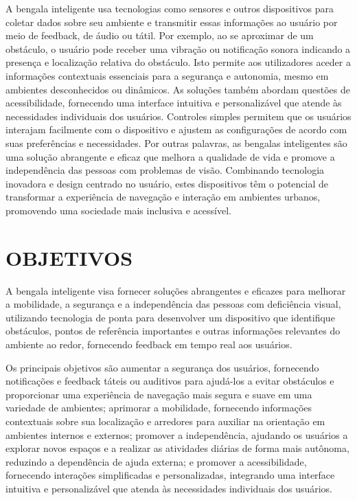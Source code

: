 A bengala inteligente usa tecnologias como sensores e outros dispositivos para coletar dados sobre seu ambiente e transmitir essas informações ao usuário por meio de feedback, de áudio ou tátil. Por exemplo, ao se aproximar de um obstáculo, o usuário pode receber uma vibração ou notificação sonora indicando a presença e localização relativa do obstáculo. Isto permite aos utilizadores aceder a informações contextuais essenciais para a segurança e autonomia, mesmo em ambientes desconhecidos ou dinâmicos.
As soluções também abordam questões de acessibilidade, fornecendo uma interface intuitiva e personalizável que atende às necessidades individuais dos usuários. Controles simples permitem que os usuários interajam facilmente com o dispositivo e ajustem as configurações de acordo com suas preferências e necessidades.
Por outras palavras, as bengalas inteligentes são uma solução abrangente e eficaz que melhora a qualidade de vida e promove a independência das pessoas com problemas de visão. Combinando tecnologia inovadora e design centrado no usuário, estes dispositivos têm o potencial de transformar a experiência de navegação e interação em ambientes urbanos, promovendo uma sociedade mais inclusiva e acessível.

\section{OBJETIVOS}

A bengala inteligente visa fornecer soluções abrangentes e eficazes para melhorar a mobilidade, a segurança e a independência das pessoas com deficiência visual, utilizando tecnologia de ponta para desenvolver um dispositivo que identifique obstáculos, pontos de referência importantes e outras informações relevantes do ambiente ao redor, fornecendo feedback em tempo real aos usuários.

Os principais objetivos são aumentar a segurança dos usuários, fornecendo notificações e feedback táteis ou auditivos para ajudá-los a evitar obstáculos e proporcionar uma experiência de navegação mais segura e suave em uma variedade de ambientes; aprimorar a mobilidade, fornecendo informações contextuais sobre sua localização e arredores para auxiliar na orientação em ambientes internos e externos; promover a independência, ajudando os usuários a explorar novos espaços e a realizar as atividades diárias de forma mais autônoma, reduzindo a dependência de ajuda externa; e promover a acessibilidade, fornecendo interações simplificadas e personalizadas, integrando uma interface intuitiva e personalizável que atenda às necessidades individuais dos usuários.


